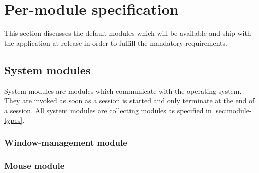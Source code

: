 \section{Per-module specification}

This section discusses the default \glspl{module} which will be available and ship with the application at release in order to fulfill the mandatory requirements.

\subsection{System modules}
\label{sec:system-modules}

System modules are \glspl{module} which communicate with the operating system. They are invoked as soon as a \gls{session} is started and only terminate at the end of a \gls{session}. All system \glspl{module} are \hyperref[collecting-module]{collecting modules} as specified in \ref{sec:module-types}.

\subsubsection{Window-management module}

\begin{itemize}
\end{itemize}

\subsubsection{Mouse module}

\begin{itemize}
\end{itemize}

